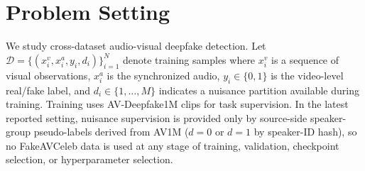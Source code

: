 \documentclass{article}
\newcommand{\method}{\textsc{TriRoute}}
\begin{document}

\section{Problem Setting}

We study cross-dataset audio-visual deepfake detection. Let $\mathcal{D} = \{(x_i^v, x_i^a, y_i, d_i)\}_{i=1}^N$ denote training samples where $x_i^v$ is a sequence of visual observations, $x_i^a$ is the synchronized audio, $y_i \in \{0,1\}$ is the video-level real/fake label, and $d_i \in \{1,\dots,M\}$ indicates a nuisance partition available during training. Training uses AV-Deepfake1M clips for task supervision. In the latest reported setting, nuisance supervision is provided only by source-side speaker-group pseudo-labels derived from AV1M ($d=0$ or $d=1$ by speaker-ID hash), so no FakeAVCeleb data is used at any stage of training, validation, checkpoint selection, or hyperparameter selection.
\end{document}
